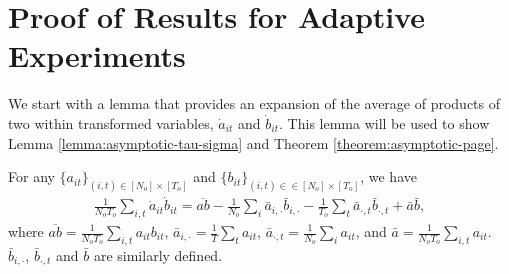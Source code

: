 \section{Proof of Results for Adaptive Experiments}\label{sec:sequential-proof}

We start with a lemma that provides an expansion of the average of products of two within transformed variables, $\dot{a}_{it} $ and $\dot{b}_{it}$. This lemma will be used to show Lemma \ref{lemma:asymptotic-tau-sigma} and Theorem \ref{theorem:asymptotic-page}.
\begin{lemma}\label{lemma:within-average}
    For any $\{a_{it}\}_{(i,t)\in [N_o]\times [T_o]}$ and $\{b_{it}\}_{(i,t)\in \in [N_o]\times [T_o]}$, we have 
    \begin{align}
    \frac{1}{N_o T_o}\sum_{i, t} \dot{a}_{it} \dot{b}_{it} = \overline{ab} - \frac{1}{N_o} \sum_i \bar{a}_{i,\cdot} \bar{b}_{i,\cdot} - \frac{1}{T_o} \sum_t \bar{a}_{\cdot,t} \bar{b}_{\cdot,t} + \bar{a} \bar{b},\label{eqn:within-average}
\end{align}
where $\overline{ab} = \frac{1}{N_o T_o} \sum_{i,t} a_{it} b_{it}$, $\bar{a}_{i,\cdot} = \frac{1}{T} \sum_t a_{it}$, $\bar{a}_{\cdot,t} = \frac{1}{N_o} \sum_i a_{it}$, and $\bar{a} = \frac{1}{N_o T_o} \sum_{i,t} a_{it}$. $\bar{b}_{i,\cdot}$, $\bar{b}_{\cdot,t}$ and $\bar{b}$ are similarly defined. 
\end{lemma}

